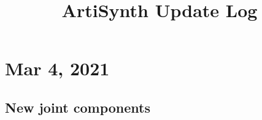 \documentclass{article}
\title{ArtiSynth Update Log}
\date{}
\begin{document}
\iflatexml
\else
\maketitle
\fi

%
%
%







\section*{Mar 4, 2021}

\subsection*{New joint components}
\end{document}
